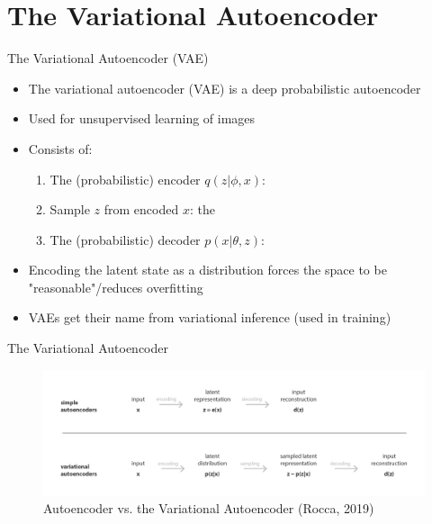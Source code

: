 \documentclass[10pt]{beamer}
\begin{document}
\section{The Variational Autoencoder}
\frame{\sectionpage}

\begin{frame}{The Variational Autoencoder (VAE)}
\begin{itemize}
\item The variational autoencoder (VAE) is a {\color{uured} deep probabilistic autoencoder}
\item Used for unsupervised learning of {\color{uured} images}\pause
\item Consists of:
\begin{enumerate}
\item The (probabilistic) encoder $q(z|\phi, x)$: 
\item Sample $z$ from encoded $x$: the 
\item The (probabilistic) decoder $p(x|\theta, z)$: 
\end{enumerate}
\pause
\item Encoding the {\color{uured} latent state as a distribution} forces the space to be "reasonable"/reduces overfitting
\pause
\item VAEs get their name from {\color{uured} variational inference} (used in training)
\end{itemize}

\end{frame}


\begin{frame}{The Variational Autoencoder}

\begin{figure}[h]
\centering
\includegraphics[width=1\textwidth]{fig/Rocca_AE_vs_VAE.png}
\caption{Autoencoder vs. the Variational Autoencoder (Rocca, 2019)}
\end{figure}

\end{frame}
\end{document}
